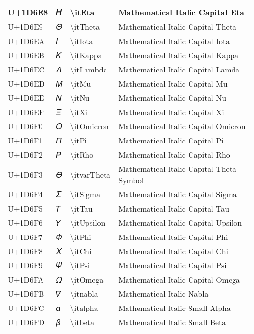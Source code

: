 \begin{table}[h]
\begin{tabulary}{\linewidth}{|L|L|L|L|}
\hline
U+1D6E8 & 𝛨 & {\textbackslash}itEta & Mathematical Italic Capital Eta \\
\hline
U+1D6E9 & 𝛩 & {\textbackslash}itTheta & Mathematical Italic Capital Theta \\
\hline
U+1D6EA & 𝛪 & {\textbackslash}itIota & Mathematical Italic Capital Iota \\
\hline
U+1D6EB & 𝛫 & {\textbackslash}itKappa & Mathematical Italic Capital Kappa \\
\hline
U+1D6EC & 𝛬 & {\textbackslash}itLambda & Mathematical Italic Capital Lamda \\
\hline
U+1D6ED & 𝛭 & {\textbackslash}itMu & Mathematical Italic Capital Mu \\
\hline
U+1D6EE & 𝛮 & {\textbackslash}itNu & Mathematical Italic Capital Nu \\
\hline
U+1D6EF & 𝛯 & {\textbackslash}itXi & Mathematical Italic Capital Xi \\
\hline
U+1D6F0 & 𝛰 & {\textbackslash}itOmicron & Mathematical Italic Capital Omicron \\
\hline
U+1D6F1 & 𝛱 & {\textbackslash}itPi & Mathematical Italic Capital Pi \\
\hline
U+1D6F2 & 𝛲 & {\textbackslash}itRho & Mathematical Italic Capital Rho \\
\hline
U+1D6F3 & 𝛳 & {\textbackslash}itvarTheta & Mathematical Italic Capital Theta Symbol \\
\hline
U+1D6F4 & 𝛴 & {\textbackslash}itSigma & Mathematical Italic Capital Sigma \\
\hline
U+1D6F5 & 𝛵 & {\textbackslash}itTau & Mathematical Italic Capital Tau \\
\hline
U+1D6F6 & 𝛶 & {\textbackslash}itUpsilon & Mathematical Italic Capital Upsilon \\
\hline
U+1D6F7 & 𝛷 & {\textbackslash}itPhi & Mathematical Italic Capital Phi \\
\hline
U+1D6F8 & 𝛸 & {\textbackslash}itChi & Mathematical Italic Capital Chi \\
\hline
U+1D6F9 & 𝛹 & {\textbackslash}itPsi & Mathematical Italic Capital Psi \\
\hline
U+1D6FA & 𝛺 & {\textbackslash}itOmega & Mathematical Italic Capital Omega \\
\hline
U+1D6FB & 𝛻 & {\textbackslash}itnabla & Mathematical Italic Nabla \\
\hline
U+1D6FC & 𝛼 & {\textbackslash}italpha & Mathematical Italic Small Alpha \\
\hline
U+1D6FD & 𝛽 & {\textbackslash}itbeta & Mathematical Italic Small Beta \\

\end{tabulary}
\end{table}
